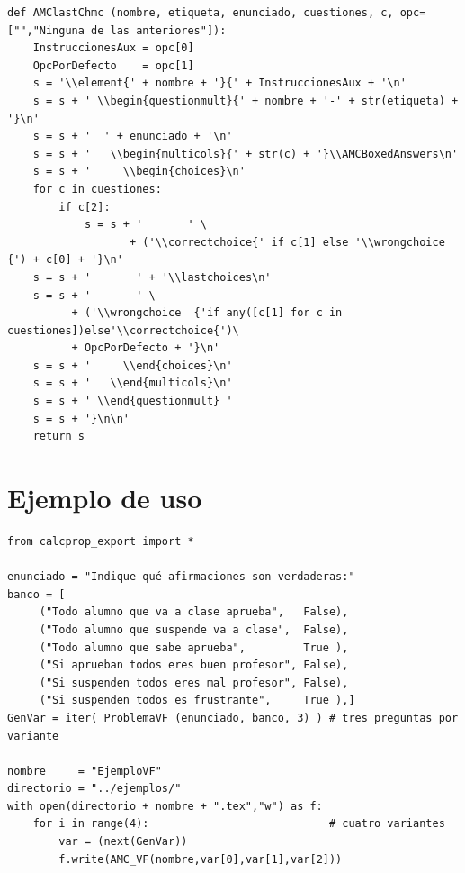 \documentclass[10pt,a4paper]{report}
\begin{document}
\begin{enumerate}
\begin{verbatim}
def AMClastChmc (nombre, etiqueta, enunciado, cuestiones, c, opc=["","Ninguna de las anteriores"]):
    InstruccionesAux = opc[0]
    OpcPorDefecto    = opc[1]
    s = '\\element{' + nombre + '}{' + InstruccionesAux + '\n'
    s = s + ' \\begin{questionmult}{' + nombre + '-' + str(etiqueta) + '}\n'
    s = s + '  ' + enunciado + '\n'
    s = s + '   \\begin{multicols}{' + str(c) + '}\\AMCBoxedAnswers\n'
    s = s + '     \\begin{choices}\n'
    for c in cuestiones:
        if c[2]:
            s = s + '       ' \
                   + ('\\correctchoice{' if c[1] else '\\wrongchoice  {') + c[0] + '}\n'
    s = s + '       ' + '\\lastchoices\n'
    s = s + '       ' \
          + ('\\wrongchoice  {'if any([c[1] for c in cuestiones])else'\\correctchoice{')\
          + OpcPorDefecto + '}\n'
    s = s + '     \\end{choices}\n'
    s = s + '   \\end{multicols}\n'
    s = s + ' \\end{questionmult} '
    s = s + '}\n\n'
    return s
\end{verbatim}
\end{enumerate}
\section{Ejemplo de uso}
\label{sec:org1f135ce}

\begin{verbatim}
from calcprop_export import *

enunciado = "Indique qué afirmaciones son verdaderas:"
banco = [
     ("Todo alumno que va a clase aprueba",   False),
     ("Todo alumno que suspende va a clase",  False),
     ("Todo alumno que sabe aprueba",         True ),
     ("Si aprueban todos eres buen profesor", False),
     ("Si suspenden todos eres mal profesor", False),
     ("Si suspenden todos es frustrante",     True ),]
GenVar = iter( ProblemaVF (enunciado, banco, 3) ) # tres preguntas por variante

nombre     = "EjemploVF"
directorio = "../ejemplos/"
with open(directorio + nombre + ".tex","w") as f:
    for i in range(4):                            # cuatro variantes
        var = (next(GenVar))
        f.write(AMC_VF(nombre,var[0],var[1],var[2]))
\end{verbatim}
\end{document}
